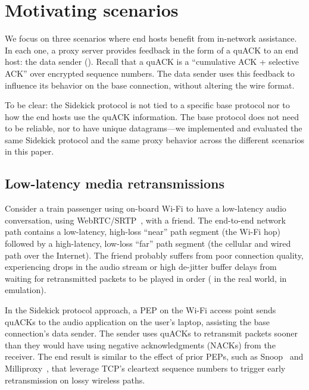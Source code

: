 \section{Motivating scenarios}
\label{sec:sidekick:motivating}



We focus on three scenarios where end hosts benefit from in-network assistance.
In each one, a proxy server provides feedback in the form of a quACK to an end
host: the data sender (). Recall that a quACK is a
``cumulative ACK + selective ACK'' over encrypted sequence numbers. The data
sender uses this feedback to influence its behavior on the base connection,
without altering the wire format.

To be clear: the Sidekick protocol is not tied to a specific base protocol
nor to how the end hosts use the quACK information. The base protocol does not
need to be reliable, nor to have unique datagrams---we implemented and evaluated
the same Sidekick protocol and the same proxy behavior across the different
scenarios in this paper.

\subsection{Low-latency media retransmissions}
\label{sec:sidekick:motivating:media}

Consider a train passenger using on-board Wi-Fi to have a low-latency audio
conversation, using WebRTC/SRTP~\cite{rfc8834webrtc}, with a friend. The
end-to-end network path contains a low-latency, high-loss ``near'' path
segment (the Wi-Fi hop) followed by a high-latency, low-loss ``far'' path
segment (the cellular and wired path over the Internet). The friend probably
suffers from poor connection quality, experiencing drops in the audio stream or
high de-jitter buffer delays from waiting for retransmitted packets to be
played in order ( in the real world,
 in emulation).

In the Sidekick protocol approach, a PEP on the Wi-Fi access point sends quACKs to
the audio application on the user's laptop, assisting the base connection's
data sender. The sender uses quACKs to retransmit packets sooner than they
would have using negative acknowledgments (NACKs) from the receiver. The end
result is similar to the effect of prior PEPs, such as
Snoop~\cite{balakrishnan1995snoop} and Milliproxy~\cite{polese2017milliproxy},
that leverage TCP's cleartext sequence numbers to trigger early retransmission
on lossy wireless paths.

